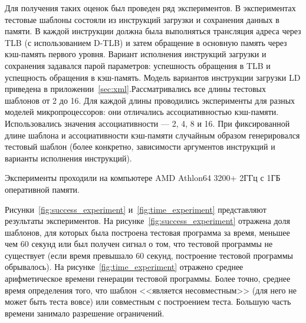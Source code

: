 Для получения таких оценок был проведен ряд экспериментов. В экспериментах тестовые шаблоны состояли из инструкций загрузки и сохранения
данных в памяти. В каждой инструкции должна была выполняться трансляция адреса
через TLB (с использованием D-TLB) и затем обращение в основную память через
кэш-память первого уровня. Вариант исполнения инструкций загрузки и сохранения задавался парой параметров: успешность обращения в TLB и успещность обращения в кэш-память. Модель вариантов инструкции загрузки LD приведена в приложении~\ref{sec:xml}.Рассматривались все длины тестовых шаблонов от 2 до
16. Для каждой длины проводились эксперименты для разных моделей микропроцессоров: они отличались ассоциативностью кэш-памяти. Использовались значения ассоциативности --- 2, 4, 8 и 16. При фиксированной длине шаблона и ассоциативности кэш-памяти случайным образом генерировался тестовый шаблон (более конкретно, зависимости аргументов инструкций и варианты исполнения инструкций).

Эксперименты проходили на компьютере AMD Athlon64 3200+ 2ГГц с 1ГБ оперативной памяти.

Рисунки~\ref{fig:success_experiment} и~\ref{fig:time_experiment} представляют
результаты экспериментов. На рисунке~\ref{fig:success_experiment} отражена доля
шаблонов, для которых была построена тестовая программа за время, меньшее чем 60 секунд или был получен сигнал о том, что тестовой программы не существует (если время превышало 60 секунд, построение тестовой программы обрывалось). На рисунке~\ref{fig:time_experiment} отражено среднее арифметическое времени генерации тестовой программы. Более точно, среднее время определения того, что шаблон <<является несовместным>> (для него не может быть теста вовсе) или
совместным с построением теста. Большую часть времени занимало разрешение ограничений.


